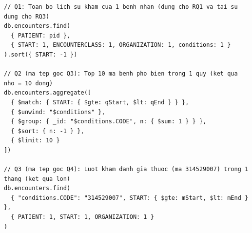 \begin{lstlisting}[language=MongoJS, caption={Mã truy vấn MongoDB cho \texttt{Q1}, \texttt{Q2} và \texttt{Q3}.}, label={lst:queries}]
// Q1: Toan bo lich su kham cua 1 benh nhan (dung cho RQ1 va tai su dung cho RQ3)
db.encounters.find(
  { PATIENT: pid },
  { START: 1, ENCOUNTERCLASS: 1, ORGANIZATION: 1, conditions: 1 }
).sort({ START: -1 })

// Q2 (ma tep goc Q3): Top 10 ma benh pho bien trong 1 quy (ket qua nho = 10 dong)
db.encounters.aggregate([
  { $match: { START: { $gte: qStart, $lt: qEnd } } },
  { $unwind: "$conditions" },
  { $group: { _id: "$conditions.CODE", n: { $sum: 1 } } },
  { $sort: { n: -1 } },
  { $limit: 10 }
])

// Q3 (ma tep goc Q4): Luot kham danh gia thuoc (ma 314529007) trong 1 thang (ket qua lon)
db.encounters.find(
  { "conditions.CODE": "314529007", START: { $gte: mStart, $lt: mEnd } },
  { PATIENT: 1, START: 1, ORGANIZATION: 1 }
)
\end{lstlisting}
\FloatBarrier
